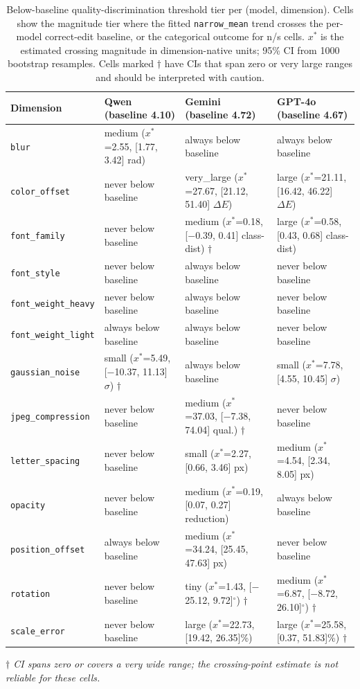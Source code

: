 \begin{table}[htbp]
\centering
\caption{Below-baseline quality-discrimination threshold tier per (model, dimension). Cells show the magnitude tier where the fitted \texttt{narrow\_mean} trend crosses the per-model correct-edit baseline, or the categorical outcome for n/s cells. $x^*$ is the estimated crossing magnitude in dimension-native units; 95\% CI from 1000 bootstrap resamples. Cells marked $\dagger$ have CIs that span zero or very large ranges and should be interpreted with caution.}
\label{tab:thresholds}
\begin{tabular}{p{3cm} p{3.8cm} p{3.8cm} p{3.8cm}}
\toprule
Dimension & Qwen (baseline 4.10) & Gemini (baseline 4.72) & GPT-4o (baseline 4.67) \\
\midrule
\texttt{blur}               & medium ($x^*$=2.55, [1.77, 3.42] rad) & always below baseline & always below baseline \\
\texttt{color\_offset}      & never below baseline & very\_large ($x^*$=27.67, [21.12, 51.40] $\Delta E$) & large ($x^*$=21.11, [16.42, 46.22] $\Delta E$) \\
\texttt{font\_family}       & never below baseline & medium ($x^*$=0.18, [$-$0.39, 0.41] class-dist) $\dagger$ & large ($x^*$=0.58, [0.43, 0.68] class-dist) \\
\texttt{font\_style}        & never below baseline & always below baseline & never below baseline \\
\texttt{font\_weight\_heavy} & never below baseline & always below baseline & never below baseline \\
\texttt{font\_weight\_light} & always below baseline & always below baseline & never below baseline \\
\texttt{gaussian\_noise}    & small ($x^*$=5.49, [$-$10.37, 11.13] $\sigma$) $\dagger$ & always below baseline & small ($x^*$=7.78, [4.55, 10.45] $\sigma$) \\
\texttt{jpeg\_compression}  & never below baseline & medium ($x^*$=37.03, [$-$7.38, 74.04] qual.) $\dagger$ & never below baseline \\
\texttt{letter\_spacing}    & never below baseline & small ($x^*$=2.27, [0.66, 3.46] px) & medium ($x^*$=4.54, [2.34, 8.05] px) \\
\texttt{opacity}            & never below baseline & medium ($x^*$=0.19, [0.07, 0.27] reduction) & always below baseline \\
\texttt{position\_offset}   & always below baseline & medium ($x^*$=34.24, [25.45, 47.63] px) & never below baseline \\
\texttt{rotation}           & never below baseline & tiny ($x^*$=1.43, [$-$25.12, 9.72]$^\circ$) $\dagger$ & medium ($x^*$=6.87, [$-$8.72, 26.10]$^\circ$) $\dagger$ \\
\texttt{scale\_error}       & never below baseline & large ($x^*$=22.73, [19.42, 26.35]\%) & large ($x^*$=25.58, [0.37, 51.83]\%) $\dagger$ \\
\bottomrule
\end{tabular}

\smallskip
\footnotesize\textit{$\dagger$ CI spans zero or covers a very wide range; the crossing-point estimate is not reliable for these cells.}
\end{table}

